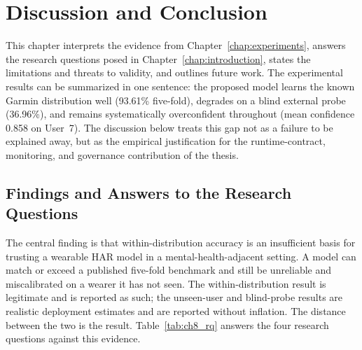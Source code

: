 \chapter{Discussion and Conclusion}
\label{chap:discussion_conclusion}

This chapter interprets the evidence from Chapter~\ref{chap:experiments}, answers the research questions posed in Chapter~\ref{chap:introduction}, states the limitations and threats to validity, and outlines future work. The experimental results can be summarized in one sentence: the proposed model learns the known Garmin distribution well (93.61\% five-fold), degrades on a blind external probe (36.96\%), and remains systematically overconfident throughout (mean confidence 0.858 on User~7). The discussion below treats this gap not as a failure to be explained away, but as the empirical justification for the runtime-contract, monitoring, and governance contribution of the thesis.

\section{Findings and Answers to the Research Questions}
\label{sec:ch8_findings_rqs}

The central finding is that within-distribution accuracy is an insufficient basis for trusting a wearable HAR model in a mental-health-adjacent setting. A model can match or exceed a published five-fold benchmark and still be unreliable and miscalibrated on a wearer it has not seen. The within-distribution result is legitimate and is reported as such; the unseen-user and blind-probe results are realistic deployment estimates and are reported without inflation. The distance between the two is the result. Table~\ref{tab:ch8_rq} answers the four research questions against this evidence.

